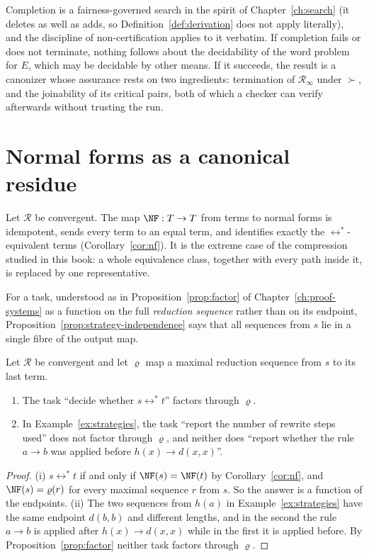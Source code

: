Completion is a fairness-governed search in the spirit of Chapter~\ref{ch:search} (it deletes as well as adds, so Definition~\ref{def:derivation} does not apply literally), and the discipline of non-certification applies to it verbatim. If completion fails or does not terminate, nothing follows about the decidability of the word problem for $E$, which may be decidable by other means. If it succeeds, the result is a canonizer whose assurance rests on two ingredients: termination of $\mathcal{R}_\infty$ under $\succ$, and the joinability of its critical pairs, both of which a checker can verify afterwards without trusting the run.

\section{Normal forms as a canonical residue}
\label{sec:nf-residue}

Let $\mathcal{R}$ be convergent. The map $\NF:T\to T$ from terms to normal forms is idempotent, sends every term to an equal term, and identifies exactly the $\leftrightarrow^{*}$-equivalent terms (Corollary~\ref{cor:nf}). It is the extreme case of the compression studied in this book: a whole equivalence class, together with every path inside it, is replaced by one representative.

For a task, understood as in Proposition~\ref{prop:factor} of Chapter~\ref{ch:proof-systems} as a function on the full \emph{reduction sequence} rather than on its endpoint, Proposition~\ref{prop:strategy-independence} says that all sequences from $s$ lie in a single fibre of the output map.

\begin{proposition}
\label{prop:nf-sufficient}
Let $\mathcal{R}$ be convergent and let $\varrho$ map a maximal reduction sequence from $s$ to its last term.
\begin{enumerate}[label=(\roman*),nosep]
\item The task ``decide whether $s\leftrightarrow^{*}t$'' factors through $\varrho$.
\item In Example~\ref{ex:strategies}, the task ``report the number of rewrite steps used'' does not factor through $\varrho$, and neither does ``report whether the rule $a\to b$ was applied before $h(x)\to d(x,x)$''.
\end{enumerate}
\end{proposition}

\begin{proof}
(i) $s\leftrightarrow^{*}t$ if and only if $\NF(s)=\NF(t)$ by Corollary~\ref{cor:nf}, and $\NF(s)=\varrho(r)$ for every maximal sequence $r$ from $s$. So the answer is a function of the endpoints. (ii) The two sequences from $h(a)$ in Example~\ref{ex:strategies} have the same endpoint $d(b,b)$ and different lengths, and in the second the rule $a\to b$ is applied after $h(x)\to d(x,x)$ while in the first it is applied before. By Proposition~\ref{prop:factor} neither task factors through $\varrho$.
\end{proof}

